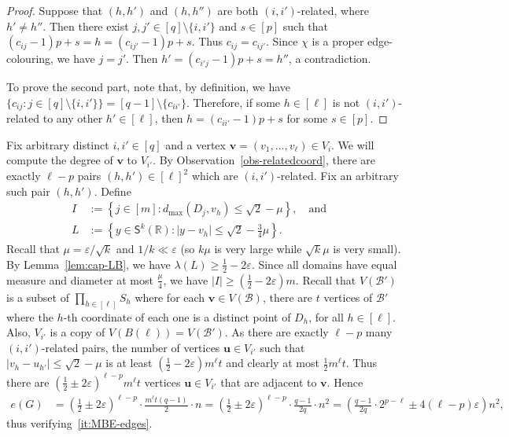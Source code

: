 \documentclass[11pt, a4paper]{article}
\newcommand{\V}[1]{\mathbold{#1}}
\theoremstyle{definition}
\def\eps{{\varepsilon}}
\newcommand{\cB}{\mathcal{B}}
\newcommand{\sS}{\mathsf{S}}
\newcommand{\sR}{\mathbb{R}}
\begin{document}
\begin{proof}
	Suppose that $(h,h')$ and $(h,h'')$ are both $(i,i')$-related, where $h' \neq h''$. Then
	there exist $j,j' \in [q]\setminus\lbrace i,i'\rbrace$ and $s \in [p]$ such that $(c_{ij}-1)p+s = h = (c_{ij'}-1)p+s$.
	Thus $c_{ij}=c_{ij'}$. Since $\chi$ is a proper edge-colouring, we have $j=j'$. Then $h' = (c_{i'j}-1)p+s = h''$, a contradiction.
	
	To prove the second part, note that, by definition, we have $\lbrace c_{ij} : j \in [q]\setminus\lbrace i,i'\rbrace \rbrace = [q-1]\setminus\lbrace c_{ii'}\rbrace$. Therefore, if some $h\in [\ell]$ is not $(i,i')$-related to any other $h'\in [\ell]$, then $h=(c_{ii'}-1)p+s$ for some $s \in [p]$.
\end{proof}


Fix arbitrary distinct $i,i'\in [q]$ and a vertex $\V{v}=(v_1,\ldots,v_\ell)\in V_i$. We will compute the degree of $\V{v}$ to $V_{i'}$. By
Observation~\ref{obs-relatedcoord}, there are exactly $\ell-p$ pairs $(h,h')\in [\ell]^2$ which are $(i,i')$-related. Fix an arbitrary such pair $(h,h')$. Define
\begin{align*}
I&:=\left\{j\in [m]:d_{\max}(D_j,v_h)\le \sqrt{2}-\mu\right\},\quad\text{and}\quad\\
L&:=\left\{y\in \sS^k(\sR):|y-v_h|\le \sqrt{2}-\frac{3}{4}\mu\right\}.
\end{align*}
Recall that $\mu = \eps/\sqrt{k}$ and $1/k \ll \eps$ (so $k\mu$ is very large while $\sqrt{k}\mu$ is very small).
By Lemma~\ref{lem:cap-LB}, we have $\lambda(L)\ge  \frac{1}{2}-2\eps$. Since all domains have equal measure and diameter at most $\frac{\mu}{4}$, we have
$|I|\ge\left(\frac{1}{2}-2\eps\right)m$.
Recall that $V(\cB')$ is a subset of $\prod_{h \in [\ell]}S_h$ where for each $\V{v} \in V(\cB)$, there are $t$ vertices of $\cB'$ where the $h$-th coordinate of each one is a distinct point of $D_h$, for all $h \in [\ell]$.
Also, $V_{i'}$ is a copy of $V(B(\ell))=V(\cB')$.
As there are exactly $\ell-p$ many $(i,i')$-related pairs, the number of vertices $\V{u}\in V_{i'}$ such that $|v_{h}-u_{h'}|\le \sqrt{2}-\mu$ is at least $\left(\frac{1}{2}-2\eps\right)m^\ell t$ and clearly at most $\frac{1}{2}m^\ell t$. Thus there are $\left(\frac{1}{2}\pm 2\eps\right)^{\ell-p}m^\ell t$ vertices $\V{u}\in V_{i'}$ that are adjacent to $\V{v}$. Hence
\begin{align*}
e(G)&= \left(\frac{1}{2}\pm 2\eps\right)^{\ell-p}\cdot\frac{m^\ell  t  (q-1)}{2}\cdot n=\left(\frac{1}{2}\pm 2\eps\right)^{\ell-p} \cdot\frac{q-1}{2q}\cdot n^2= \left(\frac{q-1}{2q}\cdot 2^{p-\ell}\pm 4(\ell-p)\eps\right)  n^2,
\end{align*}	
thus verifying~\ref{it:MBE-edges}.
\end{document}
